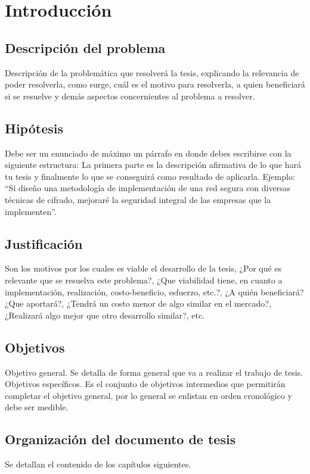  \chapter{Introducción}\label{Cap_00}

\section{Descripción del problema}
Descripción de la problemática que resolverá la tesis, explicando la relevancia de poder resolverla, como surge, cuál es el motivo para resolverla, a quien beneficiará si se resuelve y demás aspectos concernientes al problema a resolver.

\section{Hipótesis}
Debe ser un enunciado de máximo un párrafo en donde debes escribirse con la siguiente estructura:
La primera parte es la descripción afirmativa de lo que hará tu tesis y finalmente lo que se conseguirá como resultado de aplicarla. Ejemplo: “Si diseño una metodología de implementación de una red segura con diversas técnicas de cifrado, mejoraré la seguridad integral de las empresas que la implementen”.

\section{Justificación}
Son los motivos por los cuales es viable el desarrollo de la tesis, ¿Por qué es relevante que se resuelva este problema?, ¿Que viabilidad tiene, en cuanto a implementación, realización, costo-beneficio, esfuerzo, etc.?, ¿A quién beneficiará? ¿Que aportará?, ¿Tendrá un costo menor de algo similar en el mercado?, ¿Realizará algo mejor que otro desarrollo similar?, etc.

\section{Objetivos}
Objetivo general. Se detalla de forma general que va a realizar el trabajo de tesis.
Objetivos específicos. Es el conjunto de objetivos intermedios que permitirán completar el objetivo general, por lo general se enlistan en orden cronológico y debe ser medible.

\section{Organización del documento de tesis}
Se detallan el contenido de los capítulos siguientes.